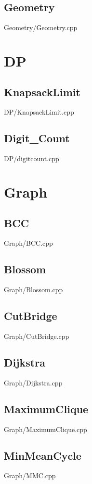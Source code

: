     \subsection{Geometry}
         {Geometry/Geometry.cpp}

\section{DP}
    \subsection{KnapsackLimit}
         {DP/KnapsackLimit.cpp}
    \subsection{Digit\_Count}
         {DP/digitcount.cpp}
    

\section{Graph}
    \subsection{BCC}
         {Graph/BCC.cpp}
    \subsection{Blossom}
         {Graph/Blossom.cpp}
    \subsection{CutBridge}
         {Graph/CutBridge.cpp}
    \subsection{Dijkstra}
         {Graph/Dijkstra.cpp}
    \subsection{MaximumClique}
         {Graph/MaximumClique.cpp}
    \subsection{MinMeanCycle}
         {Graph/MMC.cpp}
